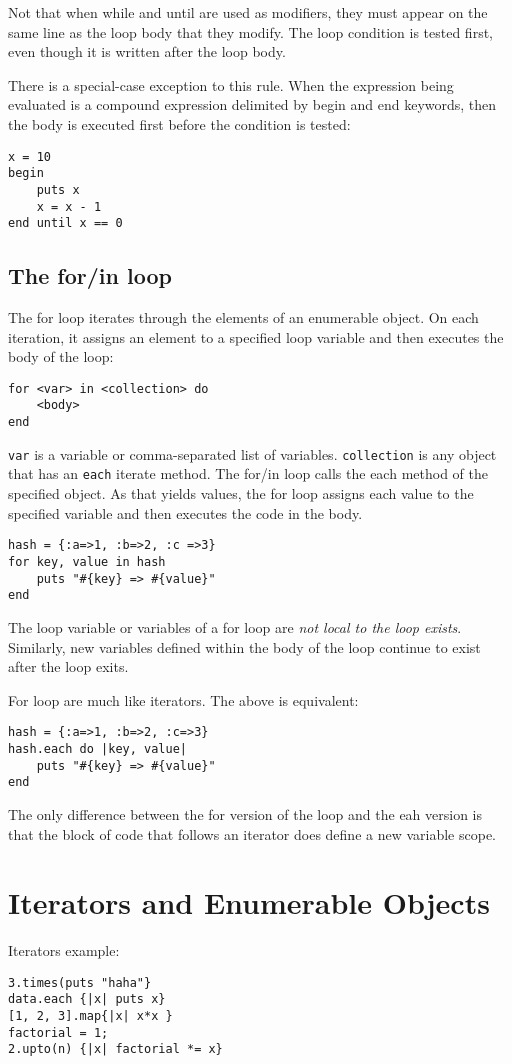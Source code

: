 \documentclass[11pt, a4paper]{book}
\begin{document}
Not that when while and until are used as modifiers, they must appear on the
same line as the loop body that they modify. The loop condition is tested first,
even though it is written after the loop body.

There is a special-case exception to this rule. When the expression being
evaluated is a compound expression delimited by begin and end keywords, then the
body is executed first before the condition is tested:
\begin{verbatim}
x = 10
begin
    puts x
    x = x - 1
end until x == 0
\end{verbatim}
\subsection{The for/in loop}
The for loop iterates through the elements of an enumerable object. On each
iteration, it assigns an element to a specified loop variable and then executes
the body of the loop:
\begin{verbatim}
for <var> in <collection> do
    <body>
end
\end{verbatim}
\verb|var| is a variable or comma-separated list of variables.
\verb|collection| is any object that has an \verb|each| iterate method. The
for/in loop calls the each method of the specified object. As that yields
values, the for loop assigns each value to the specified variable and then
executes the code in the body.
\begin{verbatim}
hash = {:a=>1, :b=>2, :c =>3}
for key, value in hash
    puts "#{key} => #{value}"
end
\end{verbatim}
The loop variable or variables of a for loop are \emph{not local to the loop
exists}. Similarly, new variables defined within the body of the loop continue
to exist after the loop exits.

For loop are much like iterators. The above is equivalent:
\begin{verbatim}
hash = {:a=>1, :b=>2, :c=>3}
hash.each do |key, value|
    puts "#{key} => #{value}"
end
\end{verbatim}
The only difference between the for version of the loop and the eah version is
that the block of code that follows an iterator does define a new variable
scope.
\section{Iterators and Enumerable Objects}
Iterators example:
\begin{verbatim}
3.times(puts "haha"}
data.each {|x| puts x}
[1, 2, 3].map{|x| x*x }
factorial = 1;
2.upto(n) {|x| factorial *= x}
\end{verbatim}
\end{document}
